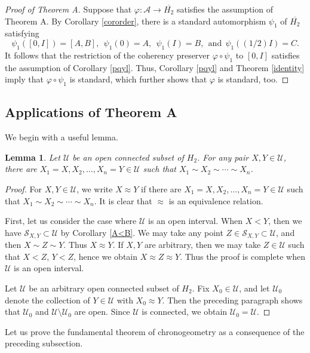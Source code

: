 \documentclass[10pt,a4paper]{amsart}
\providecommand{\index}[1]{}
\newcommand\oH{{\overline{H_2}}}
\newtheorem{lemma}[theorem]{Lemma}
\theoremstyle{definition}
\theoremstyle{remark}
\numberwithin{subsection}{section}
\numberwithin{equation}{section}
\begin{document}
\begin{proof}[Proof of Theorem A]
Suppose that $\varphi\colon \mathcal{A}\to \oH$ satisfies the assumption of Theorem A.
By Corollary \ref{cororder}, there is a standard automorphism $\psi_1$ of $\oH$ satisfying 
\[
\psi_1([0,I])=[A, B],\ \ \psi_1(0)=A,\ \ \psi_1(I)=B, \ \ \text{and} \ \ \psi_1((1/2)I)=C.
\]
It follows that the restriction of the coherency preserver $\varphi\circ \psi_1$ to $[0,I]$ satisfies the assumption of Corollary \ref{pqyl}. 
Thus, Corollary \ref{pqyl} and Theorem \ref{identity} imply that $\varphi\circ \psi_1$ is standard, which further shows that $\varphi$ is standard, too.
\end{proof}



\subsection{Applications of Theorem A}\label{apply}
We begin with a useful lemma.
\begin{lemma}\label{path}
Let $\mathcal{U}$ be an open connected subset of $H_2$. 
For any pair $X, Y\in \mathcal{U}$, there are $X_1=X, X_2, \ldots, X_n=Y\in \mathcal{U}$ such that $X_1\sim X_2\sim \cdots\sim X_n$.
\end{lemma}
\begin{proof}
For $X, Y\in \mathcal{U}$, we write $X\approx Y$ if there are $X_1=X, X_2, \ldots, X_n=Y\in \mathcal{U}$ such that $X_1\sim X_2\sim \cdots\sim X_n$.
It is clear that $\approx$ is an equivalence relation.

First, let us consider the case where $\mathcal{U}$ is an open interval. 
When $X<Y$, then we have $\mathcal{S}_{X, Y}\subset \mathcal{U}$ by Corollary \ref{A<B}. We may take any point $Z\in \mathcal{S}_{X, Y}\subset \mathcal{U}$, and then $X\sim Z\sim Y$. Thus $X\approx Y$.  
If $X, Y$ are arbitrary, then we may take $Z\in \mathcal{U}$ such that $X< Z$, $Y< Z$, hence we obtain $X\approx Z\approx Y$. 
Thus the proof is complete when $\mathcal{U}$ is an open interval. 

Let $\mathcal{U}$ be an arbitrary open connected subset of $H_2$.
Fix $X_0\in \mathcal{U}$, and let $\mathcal{U}_0$ denote the collection of $Y\in \mathcal{U}$ with $X_0\approx Y$.
Then the preceding paragraph shows that $\mathcal{U}_0$ and $\mathcal{U}\setminus\mathcal{U}_0$ are open.
Since $\mathcal{U}$ is connected, we obtain $\mathcal{U}_0=\mathcal{U}$.
\end{proof}

Let us prove the fundamental theorem of chronogeometry \index{fundamental theorem of chronogeometry} as a consequence of the preceding subsection.
\end{document}
